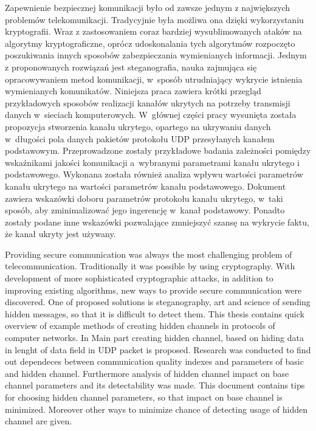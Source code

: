 \documentclass[a4paper, twoside, openright, 12pt]{report}
\newenvironment{abstractpage}
  {\vspace*{\fill}\thispagestyle{empty}}
    {\vfill}
\renewenvironment{abstract}[1]
      {\bigskip\selectlanguage{#1}%
             \begin{center}\bfseries\abstractname\end{center}}
           {\par\bigskip}
\begin{document}
\begin{abstractpage}
\begin{abstract}{polish}
    Zapewnienie bezpiecznej komunikacji było od zawsze jednym z największych
    problemów telekomunikacji. Tradycyjnie była możliwa ona
    dzięki wykorzystaniu kryptografii. Wraz z zastosowaniem coraz bardziej wysublimowanych
    ataków na algorytmy kryptograficzne, oprócz udoskonalania tych algorytmów rozpoczęto
    poszukiwania innych sposobów zabezpieczania wymienianych informacji. Jednym
    z proponowanych rozwiązań jest steganografia, nauka zajmująca się opracowywaniem
    metod komunikacji, w~sposób utrudniający wykrycie istnienia wymienianych komunikatów.
    Niniejsza praca zawiera krótki przegląd przykładowych sposobów
    realizacji kanałów ukrytych na potrzeby transmisji danych w~sieciach komputerowych.
    W~głównej części pracy wysunięta została propozycja stworzenia kanału ukrytego, opartego na ukrywaniu
    danych w~długości pola danych pakietów protokołu UDP przesyłanych kanałem podstawowym.
    Przeprowadzone
    zostały przykładowe badania zależności pomiędzy wskaźnikami jakości komunikacji
    a~wybranymi parametrami kanału ukrytego i podstawowego. Wykonana została również
    analiza wpływu wartości parametrów kanału ukrytego na wartości parametrów kanału podstawowego.
    Dokument zawiera wskazówki doboru parametrów protokołu kanału ukrytego, w~taki sposób, aby
    zminimalizować jego ingerencję w~kanał podstawowy. Ponadto zostały podane inne
    wskazówki pozwalające zmniejszyć szansę na wykrycie faktu, że kanał ukryty jest
    używany.
\end{abstract}

\begin{abstract}{english}
    Providing secure communication was always the most challenging problem
    of telecommunication. Traditionally it was possible by
    using cryptography. With development of more sophisticated cryptographic attacks,
    in addition to improving existing algorithms, new ways to provide secure communication
    were discovered. One of proposed solutions is steganography, art and science
    of sending hidden messages, so that it is difficult to detect them. This thesis
    contains quick overview of example methods of creating hidden channels in
    protocols of computer networks. In Main part creating
    hidden channel, based on hiding data in lenght of data field in UDP packet is proposed. Research was
    conducted to find out dependeces between communication quality indexes and parameters
    of basic and hidden channel. Furthermore analysis of hidden channel impact on base channel parameters
    and its detectability was made. This document contains tips for choosing hidden
    channel parameters, so that impact on base channel is minimized. Moreover
    other ways to minimize chance of detecting usage of hidden channel are given.
\end{abstract}
\end{abstractpage}
\end{document}
